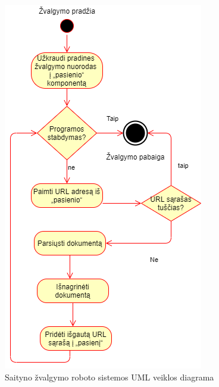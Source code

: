 \begin{figure}[ht]
\centering
\includegraphics[scale=0.6]{img/Web_Crawler_Activity_Diagram.png}
\caption{Saityno žvalgymo roboto sistemos UML veiklos diagrama \cite{CategoriesOfWebCrawlersAndOverview}}
\label{fig:system_activity_diagram}
\end{figure}